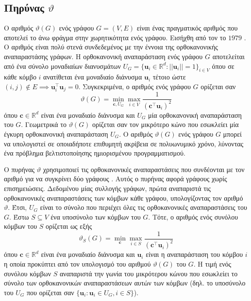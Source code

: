 \subsection{Πηρύνας  $\vartheta$}
\label{ssec:lovasz}
Ο αριθμός  $\vartheta(G)$ ενός γράφου $G=(V,E)$ είναι ένας πραγματικός αριθμός που αποτελεί το άνω φράγμα στην χωρητικότητα  ενός γράφου.
Εισήχθη από τον  το $1979$ \cite{lovasz1979shannon}.
Ο αριθμός  είναι πολύ στενά συνδεδεμένος με την έννοια της ορθοκανονικής αναπαραστάσης γράφων.
Η ορθοκανονική αναπαράσταση ενός γράφου $G$ αποτελείται από ένα σύνολο μοναδιαίων διανυσμάτων $U_G = \{ \mathbf{u}_i \in \mathbb{R}^d : || \mathbf{u}_i || = 1 \}_{i \in V}$ όπου σε κάθε κόμβο $i$ ανατίθεται ένα μοναδιαίο διάνυσμα $\mathbf{u}_i$ τέτοιο ώστε $(i,j) \not \in E \implies \mathbf{u}_i^\top \mathbf{u}_j = 0$.
Συγκεκριμένα, ο αριθμός  ενός γράφου $G$ ορίζεται σαν
\begin{equation}
    \vartheta(G) = \min_{\mathbf{c}, U_G} \max_{i \in V} \frac{1}{(\mathbf{c}^\top \mathbf{u}_i)^2}
\end{equation}
όπου $\mathbf{c} \in \mathbb{R}^d$ είναι ένα μοναδιαίο διάνυσμα και $U_G$ μία ορθοκανονική αναπαράσταση του $G$. 
Γεωμετρικά το $\vartheta(G)$ ορίζεται σαν τον μικρότερο κώνο που εσωκλείει μία έγκυρη ορθοκανονική αναπαράσταση $U_G$.
Ο αριθμός  $\vartheta(G)$ ενός γράφου $G$ μπορεί να υπολογιστεί σε οποιαδήποτε επιθυμητή ακρίβεια σε πολυωνυμικό χρόνο, λύνοντας ένα πρόβλημα βελτιστοποίησης ημιορισμένου προγραμματισμού.

Ο πυρήνας  $\vartheta$ χρησιμοποιεί τις ορθοκανονικές αναπαραστάσεις που συνδέονται με τον αριθμό  για να συγκρίνει δύο γράφους \cite{johansson2014global}.
Αυτός ο πυρήνας αφορά γράφους χωρίς επισημειώσεις.
Δεδομένου μίας συλλογής γράφων, πρώτα αναπαριστά τις ορθοκανονικές αναπαραστάσεις των κόμβων κάθε γράφου, υπολογίζοντας τον αριθμό  $\vartheta$.
Έτσι, $U_G$ είναι το σύνολο που περιέχει όλες τις ορθοκανονικές αναπαραστάσεις του $G$.
Έστω $S \subseteq V$ ένα υποσύνολο των κόμβων του $G$.
Τότε, ο αριθμός  ενός συνόλου κόμβων του $S$ ορίζεται ως εξής
\begin{equation}
    \vartheta_S(G) = \min_{\mathbf{c}} \max_{i \in S} \frac{1}{(\mathbf{c}^\top \mathbf{u}_i)^2}
\end{equation}
όπου $\mathbf{c} \in \mathbb{R}^d$ είναι ένα μοναδιαίο διάνυσμα και $\mathbf{u}_i$ είναι η αναπαράσταση του κόμβου $i$ η οποία προκύπτει από τον υπολογισμό του αριθμού  $\vartheta(G)$ του $G$.
Η τιμή  ενός συνόλου κόμβων $S$ αναπαριστά την γωνία του μικρότερου κώνου που εσωκλείει το σύνολο των ορθοκανονικών αναπαραστάσεων αυτών των κόμβων (δηλ. το υποσύνολο του $U_G$ που ορίζεται σαν $\{ \mathbf{u}_i : \mathbf{u}_i \in U_G, i \in S \}$).

